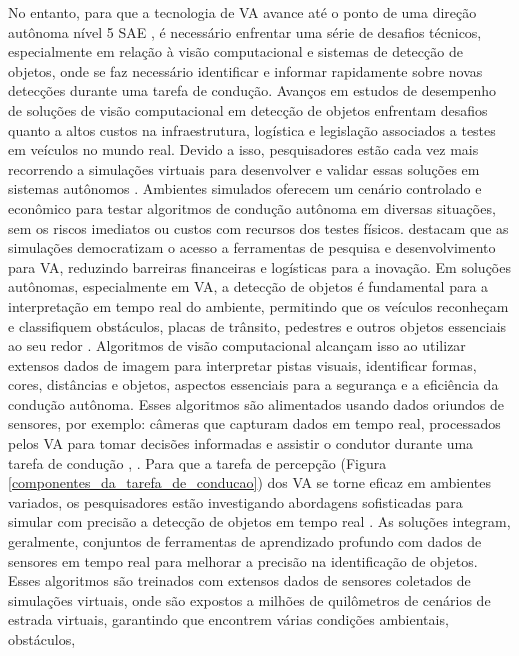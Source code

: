 \documentclass[
	12pt,				%
	oneside, %
	a4paper,			%
	english,			%
	french,				%
	spanish,			%
	brazil				%
	]{abntex2}
\begin{document}
No entanto, para que a tecnologia de VA avance até o ponto de uma direção autônoma nível 5 SAE \cite[p. ~28]{SAE}, é necessário enfrentar uma série de desafios técnicos, especialmente em relação à visão computacional e sistemas de detecção de objetos, onde se faz necessário identificar e informar rapidamente sobre novas detecções durante uma tarefa de condução. Avanços em estudos de desempenho de soluções de visão computacional em detecção de objetos enfrentam desafios quanto a %
altos custos na infraestrutura, logística e legislação associados a testes em veículos no mundo real. Devido a isso, pesquisadores estão cada vez mais recorrendo a simulações virtuais para desenvolver e validar essas soluções em sistemas autônomos \cite{dosovitskiy2017carla, ahire2024simulating}. Ambientes simulados oferecem um cenário controlado e econômico para testar algoritmos de condução autônoma em diversas situações, sem os riscos imediatos ou custos com recursos dos testes físicos.  destacam que as simulações democratizam o acesso a ferramentas de pesquisa e desenvolvimento para VA, reduzindo barreiras financeiras e logísticas para a inovação. 
Em soluções autônomas, especialmente em VA, a detecção de objetos é fundamental para a interpretação em tempo real do ambiente, permitindo que os veículos reconheçam e classifiquem obstáculos, placas de trânsito, pedestres e outros objetos essenciais ao seu redor \cite{conge, software-review, sensors-yet}. Algoritmos de visão computacional alcançam isso ao utilizar extensos dados de imagem para interpretar pistas visuais, identificar formas, cores,  distâncias e objetos, aspectos essenciais para a segurança e a eficiência da condução autônoma. Esses algoritmos são alimentados usando dados oriundos de sensores, por exemplo: câmeras que capturam dados em tempo real, processados pelos VA para tomar decisões informadas e assistir o condutor durante uma tarefa de condução \cite[p. ~15]{aplicacao2}, \cite[p. ~6]{sensors-yet}. 
Para que a tarefa de percepção (Figura \ref{componentes_da_tarefa_de_conducao}) dos VA se torne eficaz em ambientes variados, os pesquisadores estão investigando abordagens sofisticadas para simular com precisão a detecção de objetos em tempo real \cite[p. ~1]{dosovitskiy2017carla}. As soluções integram, geralmente, conjuntos de ferramentas de aprendizado profundo com dados de sensores em tempo real para melhorar a precisão na identificação de objetos. Esses algoritmos são treinados com extensos dados de sensores coletados de simulações virtuais, onde são expostos a milhões de quilômetros de cenários de estrada virtuais, garantindo que encontrem várias condições ambientais, obstáculos, %
\end{document}
